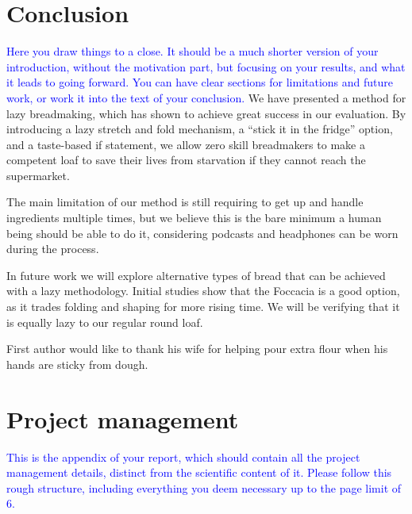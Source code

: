 \documentclass[acmtog, nonacm]{acmart}
\begin{document}
\section{Conclusion}
\textcolor{blue}{Here you draw things to a close.
It should be a much shorter version of your introduction, without the motivation part, but focusing on your results, and what it leads to going forward. 
You can have clear sections for limitations and future work, or work it into the text of your conclusion.}
We have presented a method for lazy breadmaking, which has shown to achieve great success in our evaluation. 
By introducing a lazy stretch and fold mechanism, a ``stick it in the fridge'' option, and a taste-based if statement, we allow zero skill breadmakers to make a competent loaf to save their lives from starvation if they cannot reach the supermarket. 

The main limitation of our method is still requiring to get up and handle ingredients multiple times, but we believe this is the bare minimum a human being should be able to do it, considering podcasts and headphones can be worn during the process. 

In future work we will explore alternative types of bread that can be achieved with a lazy methodology. 
Initial studies show that the Foccacia is a good option, as it trades folding and shaping for more rising time. 
We will be verifying that it is equally lazy to our regular round loaf. 


\begin{acks}
First author would like to thank his wife for helping pour extra flour when his hands are sticky from dough.
\end{acks}




\newpage
\appendix

\section{Project management}
\textcolor{blue}{This is the appendix of your report, which should contain all the project management details, distinct from the scientific content of it. 
Please follow this rough structure, including everything you deem necessary up to the page limit of 6.}
\end{document}
